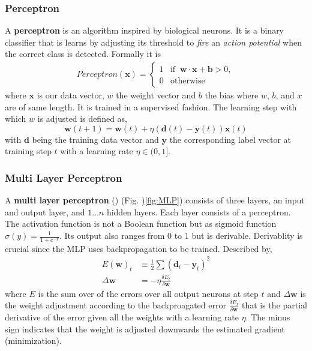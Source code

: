 \subsubsection{Perceptron}
A \textbf{perceptron} is an algorithm inspired by biological neurons. It is a binary classifier that is learns by adjusting its threshold to \textsl{fire} an \textsl{action potential} when the correct class is detected. Formally it is
\begin{gather}
  Perceptron(\mathbf{x}) = \begin{cases}1 & \text{if }\ \mathbf{w} \cdot \mathbf{x} + \mathbf{b} > 0,\\
  0 & \text{otherwise}\end{cases}
\end{gather}
where $\mathbf{x}$ is our data vector, $w$ the weight vector and $b$ the bias where $w$, $b$, and $x$ are of same length. It is trained in a supervised fashion. The learning step with which $w$ is adjusted is defined as,
\[\mathbf{w}(t+1) = \mathbf{w}(t) + \eta (\mathbf{d}(t) - \mathbf{y}(t))\mathbf{x}(t)\]
with $\mathbf{d}$ being the training data vector and $\mathbf{y}$ the corresponding label vector at training step $t$ with a learning rate $\eta \in (0,1]$.
\subsubsection{Multi Layer Perceptron}
A \textbf{multi layer perceptron} () (Fig. )\ref{fig:MLP}) consists of three layers, an input and output layer, and $1 \dots n$ hidden layers. Each layer consists of a perceptron. The activation function is not a Boolean function but as sigmoid function $\sigma(y) = \frac{1}{1+e^{-y}}$. Its output also ranges from $0$ to $1$ but is derivable. Derivablity is crucial since the MLP uses backpropagation to be trained. Described by,
\begin{align}
  E(\mathbf{w})_t &\equiv \frac{1}{2} \sum (\mathbf{d}_t - \mathbf{y}_t)^2 \\
  \Delta \mathbf{w} &= - \eta \frac{\delta E_t}{\delta \mathbf{w}}
\end{align}
where $E$ is the sum over of the errors over all output neurons at step $t$ and $\Delta \mathbf{w}$ is the weight adjustment according to the backproagated error $\frac{\delta E_t}{\delta \mathbf{w}}$ that is the partial derivative of the error given all the weights with a learning rate $\eta$. The minus sign indicates that the weight is adjusted downwards the estimated gradient (minimization).


